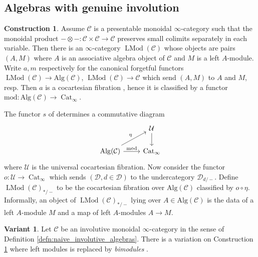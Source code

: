 \documentclass{article}
\DeclareMathOperator{\Cat}{Cat} %
\DeclareMathOperator{\LMod}{LMod} %
\theoremstyle{definition}
\newtheorem{construction}[equation]{Construction}
\newtheorem{variant}[equation]{Variant}
\newcommand{\Lucy}[1]{\todo[color=cyan!30]{\footnotesize L: #1}}
\begin{document}
\subsection{Algebras with genuine involution}
\begin{construction}\label{cons:pointed_left_module_cats}  
   Assume $ \mathcal{C} $ is a presentable monoidal $ \infty $-category such that the monoidal product $ - \otimes - \colon \mathcal{C} \times \mathcal{C} \to \mathcal{C} $ preserves small colimits separately in each variable. 
   Then there is an $ \infty $-category $ \LMod(\mathcal{C}) $ \cite[Example 4.2.1.18]{LurHA} whose objects are pairs $ (A, M) $ where $ A $ is an associative algebra object of $ \mathcal{C} $ and $ M $ is a left $ A $-module. 
   Write $ a, m $ respectively for the canonical forgetful functors $ \LMod(\mathcal{C})\to \mathrm{Alg}(\mathcal{C}) $, $ \LMod(\mathcal{C}) \to \mathcal{C} $ which send $ (A, M) $ to $ A $ and $ M $, resp. 
   Then $ a $ is a cocartesian fibration \cite[Corollary 4.2.3.7]{LurHA}, hence it is classified by a functor $ \mathrm{mod} \colon \mathrm{Alg}(\mathcal{C}) \to \Cat_\infty $. 

   The functor $ s $ of \cite[Example 4.2.1.17]{LurHA} determines a commutative diagram 
   \begin{equation}
   \begin{tikzcd}
       & \mathcal{U} \ar[d] \\
        \mathrm{Alg}(\mathcal{C}) \ar[r,"\mathrm{mod}"] \ar[ru,"\eta"] & \Cat_\infty   
   \end{tikzcd}    
   \end{equation}
   where $ \mathcal{U} $ is the universal cocartesian fibration. 
   Now consider the functor $ o \colon \mathcal{U} \to \Cat_\infty $ which sends $ (\mathcal{D}, d \in \mathcal{D}) $ to the undercategory $ \mathcal{D}_{d/-} $. 
   Define $ \LMod(\mathcal{C})_{*/-} $ to be the cocartesian fibration over $ \mathrm{Alg}(\mathcal{C}) $ classified by $ o \circ \eta $. 
   Informally, an object of $ \LMod(\mathcal{C})_{*/-} $ lying over $ A \in \mathrm{Alg}(\mathcal{C}) $ is the data of a left $ A $-module $ M $ and a map of left $ A $-modules $ A \to M $. 
\end{construction}
\begin{variant}
    Let $ \mathcal{C} $ be an involutive monoidal $ \infty $-category in the sense of Definition \ref{defn:naive_involutive_algebras}. 
    There is a variation on Construction \ref{cons:pointed_left_module_cats} where left modules is replaced by \emph{bimodules} \cite[Definition 4.3.1.12]{LurHA}. \Lucy{involutive bimodules?}
\end{variant}
\end{document}
